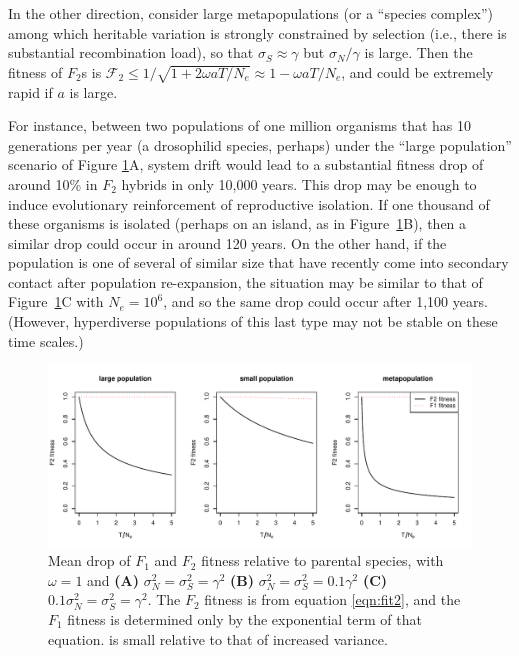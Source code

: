 \documentclass{article}
\newcommand{\1}{\mathbbm{1}}
\newcommand{\fit}{\mathcal{F}}
\begin{document}
In the other direction, consider large metapopulations (or a ``species complex'')
among which heritable variation is strongly constrained by selection
(i.e., there is substantial recombination load),
so that $\sigma_S \approx \gamma$ but $\sigma_N/\gamma$ is large.
Then the fitness of $F_2$s is $\fit_2 \le 1/\sqrt{1 + 2 \omega a T/N_e} \approx 1 - \omega a T/N_e$,
and could be extremely rapid if $a$ is large.

For instance, between two populations of one million organisms that has 10 generations per year (a drosophilid species, perhaps)
under the ``large population'' scenario of Figure \ref{fig:speciation_rates}A,
system drift would lead to a substantial fitness drop of around 10\% in $F_2$ hybrids in only 10,000 years.
This drop may be enough to induce evolutionary reinforcement of reproductive isolation.
If one thousand of these organisms is isolated (perhaps on an island, as in Figure~\ref{fig:speciation_rates}B),
then a similar drop could occur in around 120 years.
On the other hand, if the population is one of several of similar size
that have recently come into secondary contact after population re-expansion,
the situation may be similar to that of Figure~\ref{fig:speciation_rates}C with $N_e = 10^6$,
and so the same drop could occur after 1,100 years.
(However, hyperdiverse populations of this last type may not be stable on these time scales.)


\begin{figure}[H]
\label{fig:speciation_rates}
\begin{center}
\includegraphics{speciation_rates}
\caption{
Mean drop of $F_1$ and $F_2$ fitness relative to parental species,
with $\omega=1$ and 
\textbf{(A)} $\sigma_N^2 = \sigma_S^2 = \gamma^2$
\textbf{(B)} $\sigma_N^2 = \sigma_S^2 = 0.1 \gamma^2$
\textbf{(C)} $0.1 \sigma_N^2 = \sigma_S^2 = \gamma^2$.
The $F_2$ fitness is from equation \eqref{eqn:fit2},
and the $F_1$ fitness is determined only by the exponential term of that equation.
is small relative to that of increased variance.
\label{fig:speciation_rates}}
\end{center}
\end{figure}
\end{document}
